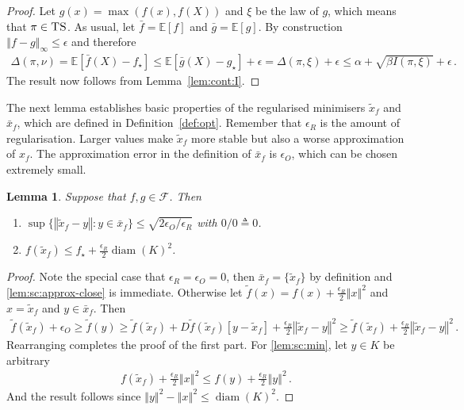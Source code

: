 \documentclass[letter, 12pt]{report}
\newcommand{\epsR}{{\epsilon_R}}
\newcommand{\epsO}{{\epsilon_O}}
\newcommand{\norm}[1]{\left \Vert  #1 \right \Vert}
\newcommand{\E}{\mathbb E}
\newcommand{\sF}{\mathscr F}
\newcommand{\diam}{\operatorname{diam}}
\newcommand{\1}{\mathbf{1}}
\newcommand{\ts}{\textsc{TS}\xspace}
\theoremstyle{plain}
\newtheorem{lemma}[theorem]{Lemma}
\theoremstyle{definition}
\theoremstyle{remark}
\begin{document}
\begin{proof}
    Let $g(x) = \max(f(x), f(X))$ and $\xi$ be the law of $g$, which means that $\pi \in \ts$. %
    As usual, let $\bar f = \E[f]$ and $\bar g = \E[g]$.
    By construction $\norm{f - g}_\infty \leq \epsilon$ and therefore
    \begin{align*}
        \Delta(\pi, \nu)
        = \E[\bar f(X) - f_\star]
        \leq \E[\bar g(X) - g_\star] + \epsilon
        = \Delta(\pi, \xi) + \epsilon
        \leq \alpha + \sqrt{\beta I(\pi, \xi)} + \epsilon \,.
    \end{align*}
    The result now follows from Lemma~\ref{lem:cont:I}.
\end{proof}

The next lemma establishes basic properties of the regularised minimisers $\tilde x_f$ and $\bar x_f$, which are defined
in Definition~\ref{def:opt}.
Remember that $\epsR$ is the amount of regularisation. Larger values make $\tilde x_f$ more stable but also a worse approximation of $x_f$.
The approximation error in the definition of $\bar x_f$ is $\epsO$, which can be chosen extremely small.

\begin{lemma}\label{lem:sc}
    Suppose that $f, g \in \sF$.
    Then
    \begin{enumerate}
        \item $\sup \{\norm{\tilde x_f - y} : y \in \bar x_f\} \leq \sqrt{2\epsO / \epsR}$ with $0/0 \triangleq 0$. \label{lem:sc:approx-close}
        \item $f(\tilde x_f) \leq f_\star + \frac{\epsR}{2} \diam(K)^2$. \label{lem:sc:min}
    \end{enumerate}
\end{lemma}

\begin{proof}
    Note the special case that $\epsR = \epsO = 0$, then $\bar x_f = \{\tilde x_f\}$ by definition and \ref{lem:sc:approx-close} is immediate.
    Otherwise
    let $\tilde f(x) = f(x) + \frac{\epsR}{2} \norm{x}^2$
    and $x = \tilde x_f$ and $y \in \bar x_f$. Then
    \begin{align*}
        \tilde f(\tilde x_f) + \epsO
        \geq \tilde f(y)
        \geq \tilde f(\tilde x_f) + D\tilde f(\tilde x_f)[y - \tilde x_f] + \frac{\epsR}{2} \norm{\tilde x_f - y}^2
        \geq \tilde f(\tilde x_f) + \frac{\epsR}{2} \norm{\tilde x_f - y}^2 \,.
    \end{align*}
    Rearranging completes the proof of the first part.
    For \ref{lem:sc:min}, let $y \in K$ be arbitrary
    \begin{align*}
        f(\tilde x_f) + \frac{\epsR}{2} \norm{x}^2 \leq f(y) + \frac{\epsR}{2} \norm{y}^2  \,.
    \end{align*}
    And the result follows since $\norm{y}^2 - \norm{x}^2 \leq \diam(K)^2$.
\end{proof}
\end{document}
